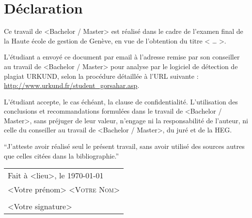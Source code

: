 

\newpage

\section*{Déclaration}		%

Ce travail de <Bachelor / Master> est réalisé dans le cadre de l’examen final de la Haute école de gestion de Genève, en vue de l’obtention du titre < … >.

L’étudiant a envoyé ce document par email à l'adresse remise par son conseiller au travail de <Bachelor / Master> pour analyse par le logiciel de détection de plagiat URKUND, selon la procédure détaillée à l’URL suivante : \url{http://www.urkund.fr/student_gorsahar.asp}.

L’étudiant accepte, le cas échéant, la clause de confidentialité. L'utilisation des conclusions et recommandations formulées dans le travail de <Bachelor / Master>, sans préjuger de leur valeur, n'engage ni la responsabilité de l'auteur, ni celle du conseiller au travail de <Bachelor / Master>, du juré et de la HEG. \bigskip{}


\enquote{J’atteste avoir réalisé seul le présent travail, sans avoir utilisé
des sources autres que celles citées dans la bibliographie.} \vspace{3cm}


\noindent \begin{flushright}
\begin{tabular}{l}
Fait à <lieu>, le \today{}\tabularnewline
<Votre prénom> \textsc{<Votre Nom>}\tabularnewline
\tabularnewline
<Votre signature>
\end{tabular}
\par\end{flushright}



